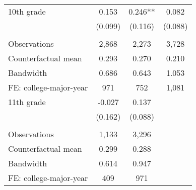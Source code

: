 {{\begin{tabular}{lccc}
10th grade          &       0.153   &       0.246** &       0.082   \\
                    &     (0.099)   &     (0.116)   &     (0.088)   \\
                    &               &               &               \\
Observations        &       2,868   &       2,273   &       3,728   \\
Counterfactual mean &       0.293   &       0.270   &       0.210   \\
Bandwidth           &       0.686   &       0.643   &       1.053   \\
FE: college-major-year&         971   &         752   &       1,081   \\
 
11th grade          &      -0.027   &       0.137   \\
                    &     (0.162)   &     (0.088)   \\
                    &               &               \\
Observations        &       1,133   &       3,296   \\
Counterfactual mean &       0.299   &       0.288   \\
Bandwidth           &       0.614   &       0.947   \\
FE: college-major-year&         409   &         971   \\
 

\bottomrule
\end{tabular}
}
}
